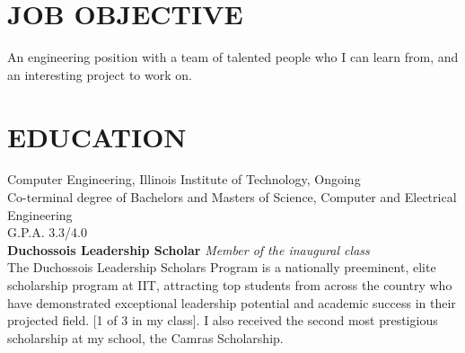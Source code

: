 \documentclass{res}
\begin{document}
 

\address{\bf  PRESENT ADDRESS\\3366 S. Michigan Ave \\Chicago, IL 60616\\(630) 450-5725}
\address{\bf PERMANENT ADDRESS \\2558 Breckeridge Ct.\\Aurora, IL 60504 \\  (630) 978-1952}
                                  
\begin{resume}

\section{JOB OBJECTIVE}          
    An engineering position with a team of talented people who I can learn from, and an interesting project to work on.
 
\section{EDUCATION}          
    Computer Engineering, Illinois Institute of Technology, Ongoing\\
    Co-terminal degree of Bachelors and Masters of Science, Computer and Electrical Engineering\\
    G.P.A. 3.3/4.0\\
    {\bf Duchossois Leadership Scholar} \emph{Member of the inaugural class}\\
  The Duchossois Leadership Scholars Program is a nationally preeminent, elite scholarship program at IIT, attracting top students from across the country who have demonstrated exceptional leadership potential and academic success in their projected field. [1 of 3 in my class]. I also received the second most prestigious scholarship at my school, the Camras Scholarship.
 

\end{resume}
\end{document}
